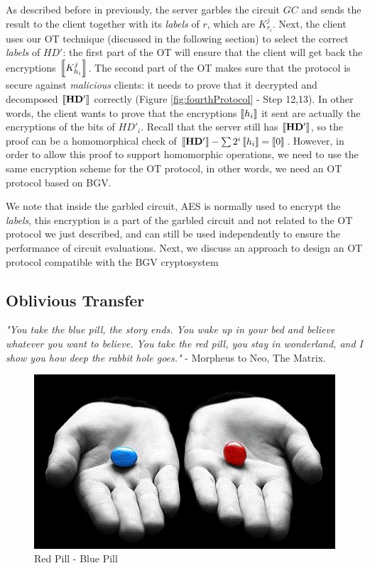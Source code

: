 As described before in previously, the server garbles
the circuit \(GC\) and sends the result to the client together with its
\textit{labels} of \(r\), which are \(K_{r_{i}}^{j}\). Next, the client uses our
OT technique (discussed in the following section) to select the correct
\textit{labels} of \(HD'\): the first part of the OT will ensure that the client
will get back the encryptions \(\left\llbracket K_{h_{i}}^{j}\right\rrbracket\). The second part of the OT
makes sure that the protocol is secure against \textit{malicious} clients: it
needs to prove that it decrypted and decomposed \(\left\llbracket\mathbf{HD'}\right\rrbracket\) correctly
(Figure \ref{fig:fourthProtocol} - Step 12,13). In other words, the client wants
to prove that the encryptions \(\left\llbracket h_{i}\right\rrbracket\) it sent are actually the
encryptions of the bits of \(HD'_{i}\). Recall that the server still has
\(\left\llbracket\mathbf{HD'}\right\rrbracket\), so the proof can be a homomorphical check of
\(\left\llbracket\mathbf{HD'}\right\rrbracket - \sum{2^{i}\left\llbracket h_{i}\right\rrbracket} = \left\llbracket0\right\rrbracket\). However,
in order to allow this proof to support homomorphic operations, we need to use
the same encryption scheme for the OT protocol, in other words, we need an OT
protocol based on BGV.

We note that inside the garbled circuit, AES is normally used to encrypt the
\textit{labels}, this encryption is a part of the garbled circuit and not
related to the OT protocol we just described, and can still be used independently
to ensure the performance of circuit evaluations. Next, we discuss an approach
to design an OT protocol compatible with the BGV cryptosystem

\subsection{Oblivious Transfer}
\label{sec:obliviousTransferPre}

\textit{"You take the blue pill, the story ends. You wake up in your bed and
  believe whatever you want to believe. You take the red pill, you stay in
  wonderland, and I show you how deep the rabbit hole goes."} - Morpheus to Neo,
The Matrix.


\begin{figure}[htbp!] 
\centering    
\includegraphics[width=1.0\textwidth]{Chapter2/Figs/Raster/RedPillBluePill}
\caption[Minion]{Red Pill - Blue Pill}
\label{fig:RedPillBluePill}
\end{figure}


